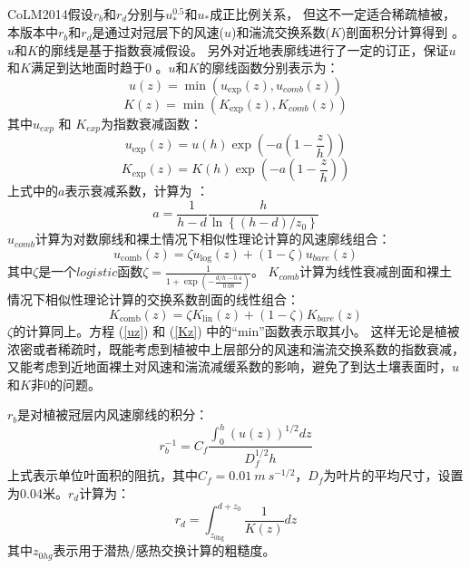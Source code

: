 CoLM2014假设$r_b$和$r_d$分别与$u_\ast^{0.5}$和$u_\ast$成正比例关系，
但这不一定适合稀疏植被，本版本中$r_b$和$r_d$是通过对冠层下的风速($u$)和湍流交换系数($K$)剖面积分计算得到 \citep{dai2019different}。
$u$和$K$的廓线是基于指数衰减假设\citep{inoue1963turbulent,cowan1968mass}。
另外对近地表廓线进行了一定的订正，保证$u$和$K$满足到达地面时趋于0 \citep{dai2019different}。$u$和$K$的廓线函数分别表示为：
\begin{equation}\label{uz}
u(z)=\min \left(u_{\exp }(z), u_{{comb }}(z)\right)
\end{equation}
\begin{equation}\label{Kz}
K(z)=\min \left(K_{\exp }(z), K_{{comb}}(z)\right)
\end{equation}
其中$u_{exp}$ 和 $K_{exp}$为指数衰减函数：
\begin{equation}
u_{\exp}(z)=u(h) \exp \left(-a\left(1-\frac{z}{h}\right)\right)
\end{equation}
\begin{equation}
K_{\exp}(z)=K(h) \exp \left(-a\left(1-\frac{z}{h}\right)\right)
\end{equation}
上式中的$a$表示衰减系数，计算为 \citep{inoue1963turbulent,cowan1968mass,kondo1971relationship}：
\begin{equation}
a=\frac{1}{h-d} \frac{h}{\ln \left\{(h-d) / z_{0}\right\}}
\end{equation}
$u_{comb}$计算为对数廓线和裸土情况下相似性理论计算的风速廓线组合：
\begin{equation}\label{ucomb}
u_{\mathrm{comb}}(z)=\zeta u_{\log }(z)+(1-\zeta) u_{{bare }}(z)
\end{equation}
其中$\zeta$是一个$logistic$函数$\zeta=\frac{1}{1+\exp{\left(-\frac{d/h-0.4}{0.08}\right)}}$。
$K_{comb}$计算为线性衰减剖面和裸土情况下相似性理论计算的交换系数剖面的线性组合：
\begin{equation}\label{kcomb}
K_{\mathrm{comb}}(z)=\zeta K_{\mathrm{lin}}(z)+(1-\zeta) K_{{bare }}(z)
\end{equation}
$\zeta$的计算同上。方程 (\ref{uz}) 和 (\ref{Kz}) 中的“min”函数表示取其小。
这样无论是植被浓密或者稀疏时，既能考虑到植被中上层部分的风速和湍流交换系数的指数衰减，
又能考虑到近地面裸土对风速和湍流减缓系数的影响，避免了到达土壤表面时，$u$和$K$非0的问题。


$r_b$是对植被冠层内风速廓线的积分：
\begin{equation}
r_{b}^{-1}=C_{f} \frac{\int_{0}^{h}(u(z))^{1 / 2} d z}{D_{f}^{1 / 2} h}
\end{equation}
上式表示单位叶面积的阻抗，其中$C_f=0.01\ m\ s^{-1/2}$，$D_f$为叶片的平均尺寸，设置为0.04米。$r_d$计算为：
\begin{equation}\label{r_d1}
r_{d}=\int_{z_{0 \mathrm{hg}}}^{d+z_{0}} \frac{1}{K(z)} d z
\end{equation}
其中$z_{0hg}$表示用于潜热/感热交换计算的粗糙度\citep{zeng1998effect}。


